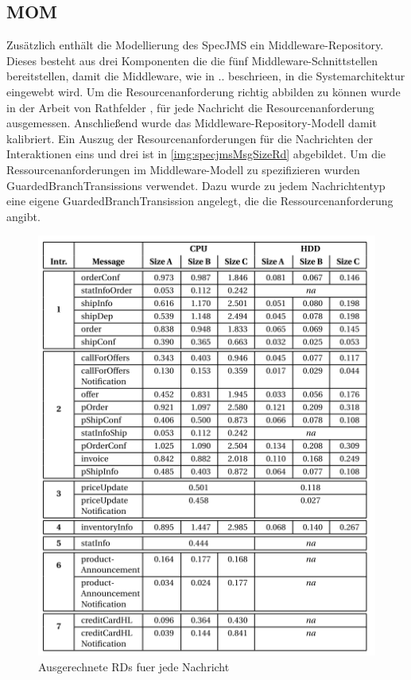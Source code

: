 \subsection{MOM}
Zusätzlich enthält die Modellierung des SpecJMS ein Middleware-Repository. Dieses besteht aus drei Komponenten die die fünf Middleware-Schnittstellen bereitstellen, damit die Middleware, wie in .. beschrieen, in die Systemarchitektur eingewebt wird. Um die Resourcenanforderung richtig abbilden zu können wurde in der Arbeit von Rathfelder \cite{Rathfelder2013}, für jede Nachricht die Resourcenanforderung ausgemessen. Anschließend wurde das Middleware-Repository-Modell damit kalibriert. Ein Auszug der Resourcenanforderungen für die Nachrichten der Interaktionen eins und drei ist in \autoref{img:specjmsMsgSizeRd} abgebildet. Um die Ressourcenanforderungen im Middleware-Modell zu spezifizieren wurden  GuardedBranchTransissions verwendet. Dazu wurde zu jedem Nachrichtentyp eine eigene GuardedBranchTransission angelegt, die die Ressourcenanforderung angibt. 
\begin{figure}
\center
  \includegraphics[width=1\textwidth]{images/specjmsmsgsizerd.png}
  \caption{Ausgerechnete RDs fuer jede Nachricht}
  \label{img:specjmsMsgSizeRd}
\end{figure}


